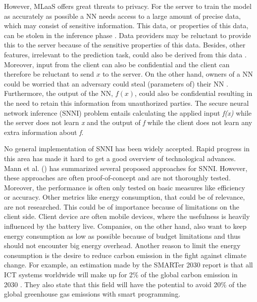 \documentclass[../thesis.tex]{subfiles}
\begin{document}
However, MLaaS offers great threats to privacy. For the server to train the model as accurately as possible a NN needs access to a large amount of precise data, which may consist of sensitive information. This data, or properties of this data, can be stolen in the inference phase \parencite{qayyum2020}. Data providers may be reluctant to provide this to the server because of the sensitive properties of this data. Besides, other features, irrelevant to the prediction task, could also be derived from this data \parencite{nasr2019}. Moreover, input from the client can also be confidential and the client can therefore be reluctant to send $x$ to the server. On the other hand, owners of a NN could be worried that an adversary could steal (parameters of) their NN \parencite{qayyum2020}. Furthermore, the output of the NN, $f(x)$, could also be confidential resulting in the need to retain this information from unauthorized parties. The secure neural network inference (SNNI) problem entails calculating the applied input \textit{f(x)} while the server does not learn \textit{x} and the output of \textit{f} while the client does not learn any extra information about \textit{f}. 


No general implementation of SNNI has been widely accepted. Rapid progress in this area has made it hard to get a good overview of technological advances. Mann et al. (\citeyear{mann22}) has summarized several proposed approaches for SNNI. However, these approaches are often proof-of-concept and are not thoroughly tested. Moreover, the performance is often only tested on basic measures like efficiency or accuracy. Other metrics like energy consumption, that could be of relevance, are not researched. This could be of importance because of limitations on the client side. Client device are often mobile devices, where the usefulness is heavily influenced by the battery live. Companies, on the other hand, also want to keep energy consumption as low as possible because of budget limitations and thus should not encounter big energy overhead. Another reason to limit the energy consumption is the desire to reduce carbon emission in the fight against climate change. For example, an estimation made by the SMARTer 2030 report is that all ICT systems worldwide will make up for 2\% of the global carbon emission in 2030 \parencite{smarter2015}. They also state that this field will have the potential to avoid 20\% of the global greenhouse gas emissions with smart programming. 
\end{document}
